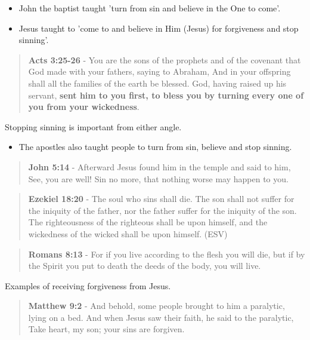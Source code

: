 \documentclass[11pt]{article}
\begin{document}
\begin{itemize}
\item John the baptist taught 'turn from sin and believe in the One to come'.
\item Jesus taught to 'come to and believe in Him (Jesus) for forgiveness and stop sinning'.
\end{itemize}

\begin{quote}
\textbf{Acts 3:25-26} - You are the sons of the prophets and of the covenant that God made with your fathers, saying to Abraham, And in your offspring shall all the families of the earth be blessed. God, having raised up his servant, \textbf{sent him to you first, to bless you by turning every one of you from your wickedness}.
\end{quote}

Stopping sinning is important from either angle.

\begin{itemize}
\item The apostles also taught people to turn from sin, believe and stop sinning.
\end{itemize}

\begin{quote}
\textbf{John 5:14} - Afterward Jesus found him in the temple and said to him, See, you are well! Sin no more, that nothing worse may happen to you.
\end{quote}

\begin{quote}
\textbf{Ezekiel 18:20} - The soul who sins shall die. The son shall not suffer for the iniquity of the father, nor the father suffer for the iniquity of the son. The righteousness of the righteous shall be upon himself, and the wickedness of the wicked shall be upon himself. (ESV)
\end{quote}

\begin{quote}
\textbf{Romans 8:13} - For if you live according to the flesh you will die, but if by the Spirit you put to death the deeds of the body, you will live.
\end{quote}

Examples of receiving forgiveness from Jesus.

\begin{quote}
\textbf{Matthew 9:2} - And behold, some people brought to him a paralytic, lying on a bed. And when Jesus saw their faith, he said to the paralytic, Take heart, my son; your sins are forgiven.
\end{quote}
\end{document}
